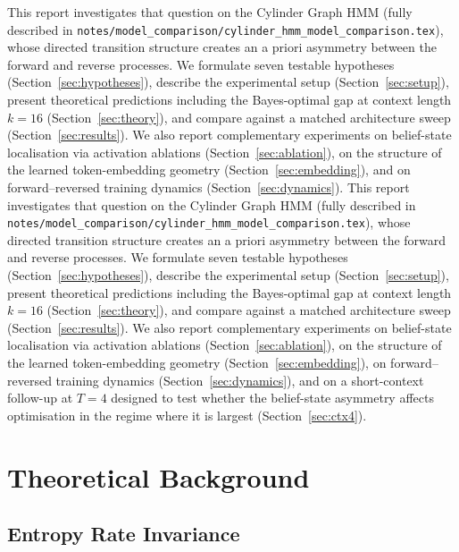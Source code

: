 \documentclass[11pt]{article}
\newcommand{\claude}[1]{{\color{red}\textsf{#1}}}
\newcommand{\old}[1]{{\color{gray}#1}}
\begin{document}
\old{This report investigates that question on the Cylinder Graph HMM (fully described in \texttt{notes/model\_comparison/cylinder\_hmm\_model\_comparison.tex}), whose directed transition structure creates an a priori asymmetry between the forward and reverse processes.  We formulate seven testable hypotheses (Section~\ref{sec:hypotheses}), describe the experimental setup (Section~\ref{sec:setup}), present theoretical predictions including the Bayes-optimal gap at context length $k = 16$ (Section~\ref{sec:theory}), and compare against a matched architecture sweep (Section~\ref{sec:results}).  We also report complementary experiments on belief-state localisation via activation ablations (Section~\ref{sec:ablation}), on the structure of the learned token-embedding geometry (Section~\ref{sec:embedding}), and on forward--reversed training dynamics (Section~\ref{sec:dynamics}).} \claude{This report investigates that question on the Cylinder Graph HMM (fully described in \texttt{notes/model\_comparison/cylinder\_hmm\_model\_comparison.tex}), whose directed transition structure creates an a priori asymmetry between the forward and reverse processes.  We formulate seven testable hypotheses (Section~\ref{sec:hypotheses}), describe the experimental setup (Section~\ref{sec:setup}), present theoretical predictions including the Bayes-optimal gap at context length $k = 16$ (Section~\ref{sec:theory}), and compare against a matched architecture sweep (Section~\ref{sec:results}).  We also report complementary experiments on belief-state localisation via activation ablations (Section~\ref{sec:ablation}), on the structure of the learned token-embedding geometry (Section~\ref{sec:embedding}), on forward--reversed training dynamics (Section~\ref{sec:dynamics}), and on a short-context follow-up at $T = 4$ designed to test whether the belief-state asymmetry affects optimisation in the regime where it is largest (Section~\ref{sec:ctx4}).}

\section{Theoretical Background}

\subsection{Entropy Rate Invariance}
\end{document}
